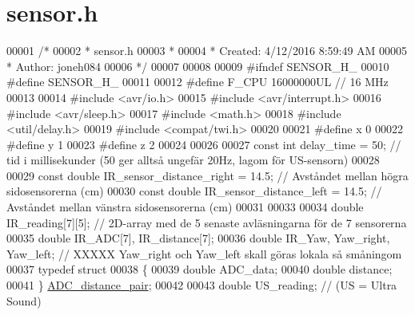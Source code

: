 \hypertarget{sensor_8h_source}{}\section{sensor.\+h}
\label{sensor_8h_source}

\begin{DoxyCode}
00001 \textcolor{comment}{/*}
00002 \textcolor{comment}{ * sensor.h}
00003 \textcolor{comment}{ *}
00004 \textcolor{comment}{ * Created: 4/12/2016 8:59:49 AM}
00005 \textcolor{comment}{ *  Author: joneh084}
00006 \textcolor{comment}{ */} 
00007 
00008 
00009 \textcolor{preprocessor}{#ifndef SENSOR\_H\_}
00010 \textcolor{preprocessor}{#define SENSOR\_H\_}
00011 
00012 \textcolor{preprocessor}{#define F\_CPU 16000000UL        // 16 MHz}
00013 
00014 \textcolor{preprocessor}{#include <avr/io.h>}
00015 \textcolor{preprocessor}{#include <avr/interrupt.h>}
00016 \textcolor{preprocessor}{#include <avr/sleep.h>}
00017 \textcolor{preprocessor}{#include <math.h>}
00018 \textcolor{preprocessor}{#include <util/delay.h>}
00019 \textcolor{preprocessor}{#include <compat/twi.h>}
00020 
00021 \textcolor{preprocessor}{#define x 0}
00022 \textcolor{preprocessor}{#define y 1}
00023 \textcolor{preprocessor}{#define z 2}
00024 
00026 
00027 \textcolor{keyword}{const} \textcolor{keywordtype}{int} delay\_time = 50;                          \textcolor{comment}{// tid i millisekunder (50 ger alltså ungefär 20Hz,
       lagom för US-sensorn)}
00028 
00029 \textcolor{keyword}{const} \textcolor{keywordtype}{double} IR\_sensor\_distance\_right = 14.5;       \textcolor{comment}{// Avståndet mellan högra sidosensorerna (cm)}
00030 \textcolor{keyword}{const} \textcolor{keywordtype}{double} IR\_sensor\_distance\_left = 14.5;        \textcolor{comment}{// Avståndet mellan vänstra sidosensorerna (cm)}
00031 
00033 
00034 \textcolor{keywordtype}{double} IR\_reading[7][5];                            \textcolor{comment}{// 2D-array med de 5 senaste avläsningarna för de 7
       sensorerna}
00035 \textcolor{keywordtype}{double} IR\_ADC[7], IR\_distance[7];
00036 \textcolor{keywordtype}{double} IR\_Yaw, Yaw\_right, Yaw\_left;                 \textcolor{comment}{// XXXXX Yaw\_right och Yaw\_left skall göras lokala så
       småningom}
00037 \textcolor{keyword}{typedef} \textcolor{keyword}{struct}
00038 \{
00039     \textcolor{keywordtype}{double} ADC\_data;
00040     \textcolor{keywordtype}{double} distance;
00041 \} \hyperlink{struct_a_d_c__distance__pair}{ADC\_distance\_pair};
00042 
00043 \textcolor{keywordtype}{double} US\_reading;                                  \textcolor{comment}{// (US = Ultra Sound)}

\end{DoxyCode}
